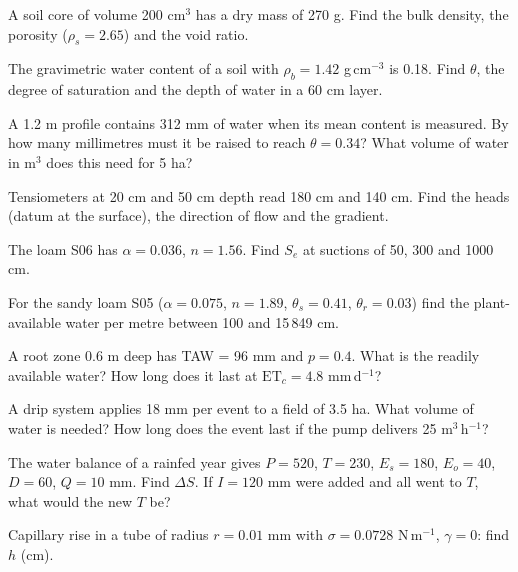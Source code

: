 \begin{exlist}
\item A soil core of volume 200 cm$^3$ has a dry mass of 270 g. Find the bulk density, the porosity ($\rho_s=2.65$) and the void ratio.
\item The gravimetric water content of a soil with $\rho_b=1.42$ g\,cm$^{-3}$ is 0.18. Find $\theta$, the degree of saturation and the depth of water in a 60 cm layer.
\item A 1.2 m profile contains 312 mm of water when its mean content is measured. By how many millimetres must it be raised to reach $\theta=0.34$? What volume of water in m$^3$ does this need for 5 ha?
\item Tensiometers at 20 cm and 50 cm depth read 180 cm and 140 cm. Find the heads (datum at the surface), the direction of flow and the gradient.
\item The loam S06 has $\alpha=0.036$, $n=1.56$. Find $S_e$ at suctions of 50, 300 and 1000 cm.
\item For the sandy loam S05 ($\alpha=0.075$, $n=1.89$, $\theta_s=0.41$, $\theta_r=0.03$) find the plant-available water per metre between 100 and 15\,849 cm.
\item A root zone 0.6 m deep has TAW = 96 mm and $p=0.4$. What is the readily available water? How long does it last at $\mathrm{ET}_c=4.8$ mm\,d$^{-1}$?
\item A drip system applies 18 mm per event to a field of 3.5 ha. What volume of water is needed? How long does the event last if the pump delivers 25 m$^3$\,h$^{-1}$?
\item The water balance of a rainfed year gives $P=520$, $T=230$, $E_s=180$, $E_o=40$, $D=60$, $Q=10$ mm. Find $\Delta S$. If $I=120$ mm were added and all went to $T$, what would the new $T$ be?
\item Capillary rise in a tube of radius $r=0.01$ mm with $\sigma=0.0728$ N\,m$^{-1}$, $\gamma=0$: find $h$ (cm).\exans{148 cm}
\end{exlist}
